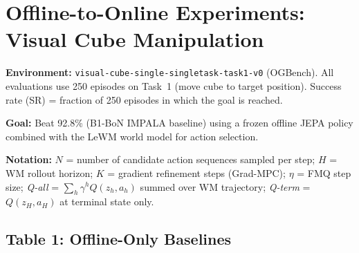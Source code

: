 \documentclass[11pt]{article}
\begin{document}
\section*{Offline-to-Online Experiments: Visual Cube Manipulation}

\noindent\textbf{Environment:} \texttt{visual-cube-single-singletask-task1-v0} (OGBench).
All evaluations use 250 episodes on Task~1 (move cube to target position).
Success rate (SR) = fraction of 250 episodes in which the goal is reached.

\noindent\textbf{Goal:} Beat 92.8\% (B1-BoN IMPALA baseline) using a frozen offline JEPA policy
combined with the LeWM world model for action selection.

\noindent\textbf{Notation:}
$N$ = number of candidate action sequences sampled per step;
$H$ = WM rollout horizon;
$K$ = gradient refinement steps (Grad-MPC);
$\eta$ = FMQ step size;
\emph{Q-all} = $\sum_h \gamma^h Q(z_h, a_h)$ summed over WM trajectory;
\emph{Q-term} = $Q(z_H, a_H)$ at terminal state only.

\subsection*{Table 1: Offline-Only Baselines}
\end{document}
